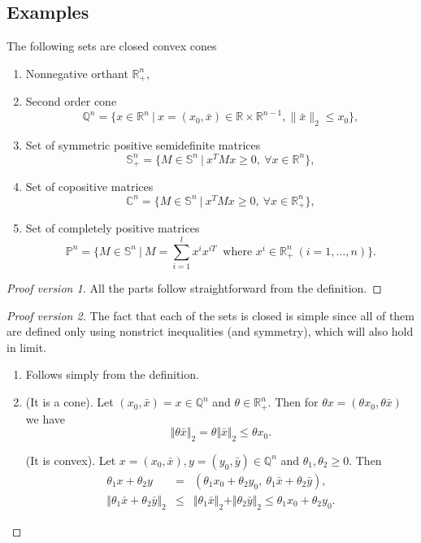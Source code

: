 \documentclass[12pt]{book}
\theoremstyle{definition}
\begin{document}
\begin{appendix}
\begin{itemize}
\end{itemize}


\subsection{Examples}


 The following sets are closed convex cones 
\label{ExClosedConvexCones}
\begin{enumerate}
\item Nonnegative orthant $\mathbb{R}^n_+$,
\item Second order cone $$\mathbb{Q}^n=\{x\in \mathbb{R}^n \ | \ x = (x_0,\bar{x}) \in \mathbb{R}\times\mathbb{R}^{n-1}, \|\bar{x}\|_2\leq x_0\},$$
\item Set of symmetric positive semidefinite matrices  $$\mathbb{S}^n_+ = \{M \in \mathbb{S}^n \ \vert \ x^TMx\geq 0, \  \forall x\in \mathbb{R}^n\},$$
\item Set of copositive matrices $$\mathbb{C}^n = \{M \in \mathbb{S}^n \ \vert \ x^TMx\geq 0, \  \forall x\in \mathbb{R}^n_+\},$$
\item Set of completely positive matrices $$\mathbb{P}^n = \{M\in \mathbb{S}^n \ | \ M = \sum_{i = 1}^l x^{i}x^{iT} \ \mbox{ where } x^i \in \mathbb{R}^n_+ \ (i = 1,\dots ,n) \}.$$
\end{enumerate} 

\begin{proof}[Proof version 1]
All the parts follow straightforward from the definition. 
\end{proof}
\begin{proof}[Proof version 2]
The fact that each of the sets is closed is simple since all of them are defined only using nonstrict inequalities (and symmetry), which will also hold in limit. %
\begin{enumerate}
\item Follows simply from the definition.
\item (It is a cone). Let $(x_0,\bar{x})= x\in \mathbb{Q}^n$ and $\theta \in \mathbb{R}^n_+$.
Then for $\theta x = (\theta x_0, \theta\bar{x})$ we have  
$$\Vert \theta\bar{x}\Vert_2 = \theta \Vert \bar{x}\Vert_2 \leq \theta x_0.$$

(It is convex). Let $x=(x_0,\bar{x}),y=(y_0,\bar{y})\in\mathbb{Q}^n$ and $\theta_1, \theta_2 \geq 0$.
Then 
\begin{eqnarray*}
\theta_1x + \theta_2y &=& (\theta_1x_0+\theta_2y_0,\  \theta_1\bar{x} + \theta_2\bar{y}),  \\
\Vert \theta_1\bar{x} + \theta_2\bar{y} \Vert_2 &\leq & \Vert \theta_1\bar{x} \Vert_2 + \Vert \theta_2\bar{y} \Vert_2 \leq  \theta_1x_0+\theta_2y_0.
\end{eqnarray*}


\end{enumerate}
\end{proof}
\end{appendix}
\end{document}
